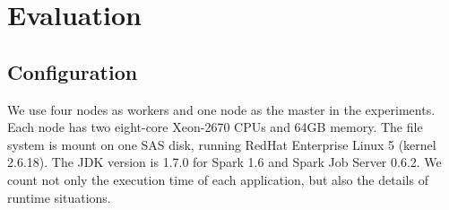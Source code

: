 \section{Evaluation}

\subsection{Configuration}

We use four nodes as workers and one node as the master in the experiments. Each node has two eight-core Xeon-2670 CPUs and 64GB memory. The file system is mount on one SAS disk, running RedHat Enterprise Linux 5 (kernel 2.6.18). The JDK version is 1.7.0 for Spark 1.6 and Spark Job Server 0.6.2. We count not only the execution time of each application, but also the details of runtime situations.